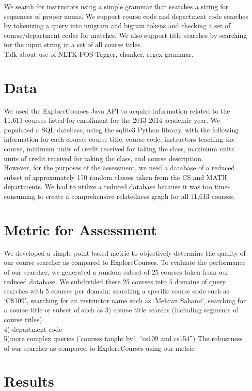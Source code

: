 \documentclass[12pt]{article}
\begin{document}
We search for instructors using a simple grammar that searches a string for sequences of proper nouns. We support course code and department code searches by tokenizing a query into unigram and bigram tokens and checking a set of course/department codes for matches. We also support title searches by searching for the input string in a set of all course titles.\\
Talk about use of NLTK POS-Tagger, chunker, regex grammar.

\section*{Data}
	 We used the ExploreCourses Java API to acquire information related to the 11,613 courses listed for enrollment for the 2013-2014 academic year. We populated a SQL datebase, using the sqlite3 Python library, with the following information for each course: course title, course code, instructors teaching the course, minimum units of credit received for taking the class, maximum units units of credit received for taking the class, and course description. \\

	 However, for the purposes of the assessment, we used a database of a reduced subset of approximately 170 random classes taken from the CS and MATH departments. We had to utilize a reduced database because it was too time-consuming to create a comprehensive relatedness graph for all 11,613 courses.

\section*{Metric for Assessment}
	We developed a simple point-based metric to objectively
        determine the quality of our course searcher as compared to ExploreCourses. To evaluate the performance of our searcher, we generated a random subset of 25 courses taken from our reduced database. We subdivided these 25 courses into 5 domains of query searches with 5 courses per domain: searching a specific course code such as `CS109', searching for an instructor name such as `Mehran Sahami', searching for a course title or subset of such as 
3) course title searchs (including segments of course titles)\\
4) department code\\
5)more complex queries ('courses taught by', ``cs109 and cs154'')
	The robustness of our searcher as compared to ExploreCourses using our metric 
\section*{Results}
	
\end{document}
